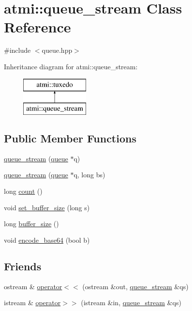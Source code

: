 \hypertarget{classatmi_1_1queue__stream}{}\section{atmi\+:\+:queue\+\_\+stream Class Reference}
\label{classatmi_1_1queue__stream}


{\ttfamily \#include $<$queue.\+hpp$>$}

Inheritance diagram for atmi\+:\+:queue\+\_\+stream\+:\begin{figure}[H]
\begin{center}
\leavevmode
\includegraphics[height=2.000000cm]{classatmi_1_1queue__stream}
\end{center}
\end{figure}
\subsection*{Public Member Functions}
\begin{DoxyCompactItemize}
\item 
\hyperlink{classatmi_1_1queue__stream_a775623d6cd91a8a3cd40d9bb1e492c60}{queue\+\_\+stream} (\hyperlink{classatmi_1_1queue}{queue} $\ast$q)
\item 
\hyperlink{classatmi_1_1queue__stream_af05f48449db9ed2282643d9e7c148944}{queue\+\_\+stream} (\hyperlink{classatmi_1_1queue}{queue} $\ast$q, long bs)
\item 
long \hyperlink{classatmi_1_1queue__stream_ac4f1e88530a4d9fda0bc4b271301866b}{count} ()
\item 
void \hyperlink{classatmi_1_1queue__stream_a500b658e3f3f1a353982a1304ea27801}{set\+\_\+buffer\+\_\+size} (long s)
\item 
long \hyperlink{classatmi_1_1queue__stream_a18d01411c5ffeffd190195fd2b4dc61a}{buffer\+\_\+size} ()
\item 
void \hyperlink{classatmi_1_1queue__stream_a4a47e7caf329e46c31f44425e3ceb6e3}{encode\+\_\+base64} (bool b)
\end{DoxyCompactItemize}
\subsection*{Friends}
\begin{DoxyCompactItemize}
\item 
ostream \& \hyperlink{classatmi_1_1queue__stream_ad655c66351739698af3d404de31d3179}{operator$<$$<$} (ostream \&out, \hyperlink{classatmi_1_1queue__stream}{queue\+\_\+stream} \&qs)
\item 
istream \& \hyperlink{classatmi_1_1queue__stream_a52e264f6a625c0a453157abc46da7efe}{operator$>$$>$} (istream \&in, \hyperlink{classatmi_1_1queue__stream}{queue\+\_\+stream} \&qs)
\end{DoxyCompactItemize}

